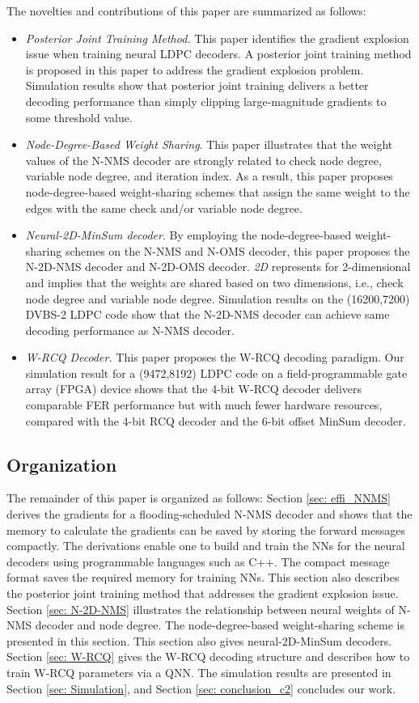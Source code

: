 \documentclass [PhD] {uclathes}
\begin{document}
The novelties and contributions of this paper are summarized as follows:  
\begin{itemize}
    \item \textit{Posterior Joint Training Method.} This paper identifies the gradient explosion issue when training neural LDPC decoders. A posterior joint training method is proposed in this paper to address the gradient explosion problem. Simulation results show that posterior joint training delivers a better decoding performance than simply clipping large-magnitude gradients to some threshold value.
     \item \textit{Node-Degree-Based Weight Sharing}. 
     This paper illustrates that the weight values of the N-NMS decoder are strongly related to check node degree, variable node degree, and iteration index. As a result, this paper proposes node-degree-based weight-sharing schemes that assign the same weight to the edges with the same check and/or variable node degree.
     \item \textit{Neural-2D-MinSum decoder}. By employing the node-degree-based weight-sharing schemes on the N-NMS and N-OMS decoder, this paper proposes the N-2D-NMS decoder and N-2D-OMS decoder. \emph{2D} represents for 2-dimensional and implies that the weights are shared based on two dimensions, i.e., check node degree and variable node degree.
     Simulation results on the (16200,7200) DVBS-2 LDPC code show that the N-2D-NMS decoder can achieve same decoding performance as N-NMS decoder. 
    \item  \textit{W-RCQ Decoder.} This paper proposes the W-RCQ decoding paradigm.  Our simulation result for a (9472,8192) LDPC code on a field-programmable gate array (FPGA) device shows that the 4-bit W-RCQ decoder delivers comparable FER performance but with much fewer hardware resources, compared with the 4-bit RCQ decoder and the 6-bit offset MinSum decoder.
\end{itemize}

\subsection{Organization}

The remainder of this paper is organized as follows: Section \ref{sec: effi_NNMS} derives the gradients for a flooding-scheduled N-NMS decoder and shows that the memory to calculate the gradients can be saved by storing the forward messages compactly. The derivations enable one to build and train the NNs for the neural decoders using programmable languages such as C++. The compact message format saves the required memory for training NNs. This section also describes the posterior joint training method that addresses the gradient explosion issue. Section \ref{sec: N-2D-NMS} illustrates the relationship between neural weights of N-NMS decoder and node degree. The node-degree-based weight-sharing scheme is presented in this section. This section also gives neural-2D-MinSum decoders. Section \ref{sec: W-RCQ} gives the W-RCQ decoding structure and describes how to train W-RCQ  parameters via a QNN. The simulation results are presented in Section \ref{sec: Simulation}, and Section \ref{sec: conclusion_c2} concludes our work. 
\end{document}
